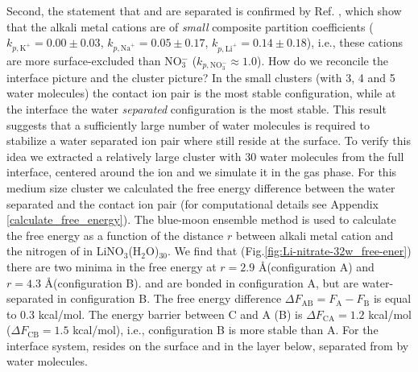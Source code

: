 Second, the statement that \Li and \nitrate are separated is confirmed by Ref. \cite{Pegram2006,Pegram2008},
which show that the alkali metal cations are of \emph{small}
composite partition coefficients ($k_{p,\text{K}^+} = 0.00\pm 0.03$, $k_{p,\text{Na}^+} = 0.05\pm 0.17$, $k_{p,\text{Li}^+} = 0.14\pm 0.18$), i.e., 
these cations are more surface-excluded than 
NO$_3^-$ ($k_{p,\text{NO}_3^-} \approx 1.0$).
How do we reconcile the interface picture and the cluster picture?
In the small clusters (with 3, 4 and 5 water molecules) the contact ion pair is the most stable configuration, 
while at the interface the water \emph{separated} configuration is the most stable.
This result suggests that a sufficiently large number of water molecules is required to stabilize a water separated ion pair where
\nitrate still reside at the surface. 
To verify this idea we extracted a relatively large cluster with 30 water molecules from the full interface, centered
around the \Li ion and we simulate it in the gas phase. 
For this medium size cluster we calculated the free energy difference between the
water separated and the contact ion pair (for computational details see Appendix \ref{calculate_free_energy}). 
The blue-moon ensemble method\cite{Carter1989,Sprik1998,Tuckerman10} is used to calculate the free energy as a function of  
the distance $r$ between alkali metal cation and the nitrogen of \nitrate in LiNO$_3$(H$_2$O)$_{30}$.
We find that (Fig.\thinspace\ref{fig:Li-nitrate-32w_free-ener})
there are two minima in the free energy
at $r=2.9$ \AA (configuration A)  and $r=4.3$ \AA(configuration B).
\Li and \nitrate are bonded in configuration A, but are water-separated in configuration B.
The free energy difference $\Delta{F}_{\text{AB}}=F_{\text{A}}-F_{\text{B}}$ is equal to 0.3 kcal/mol. 
The energy barrier between C and A (B) is
$\Delta{F_{\text{CA}}} = 1.2$ kcal/mol ($\Delta F_{\text{CB}} = 1.5$ kcal/mol), i.e., configuration B is more stable than A.
For the interface system, \nitrate resides on the surface and \Li in the layer below, separated from \nitrate by water molecules.
